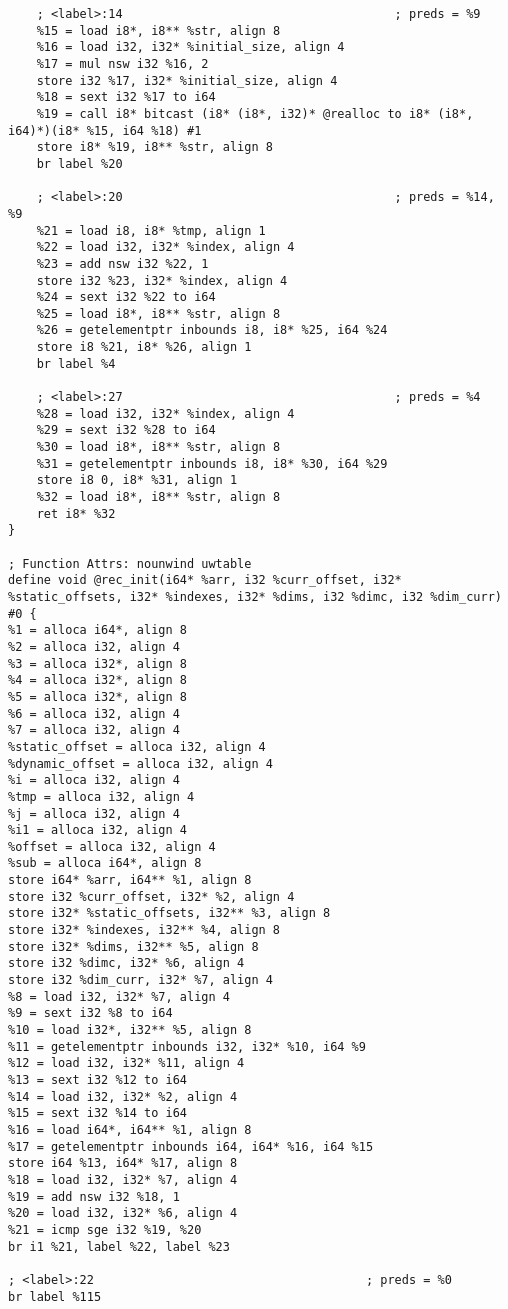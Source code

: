 \begin{verbatim}
	; <label>:14                                      ; preds = %9
	%15 = load i8*, i8** %str, align 8
	%16 = load i32, i32* %initial_size, align 4
	%17 = mul nsw i32 %16, 2
	store i32 %17, i32* %initial_size, align 4
	%18 = sext i32 %17 to i64
	%19 = call i8* bitcast (i8* (i8*, i32)* @realloc to i8* (i8*, i64)*)(i8* %15, i64 %18) #1
	store i8* %19, i8** %str, align 8
	br label %20
	
	; <label>:20                                      ; preds = %14, %9
	%21 = load i8, i8* %tmp, align 1
	%22 = load i32, i32* %index, align 4
	%23 = add nsw i32 %22, 1
	store i32 %23, i32* %index, align 4
	%24 = sext i32 %22 to i64
	%25 = load i8*, i8** %str, align 8
	%26 = getelementptr inbounds i8, i8* %25, i64 %24
	store i8 %21, i8* %26, align 1
	br label %4
	
	; <label>:27                                      ; preds = %4
	%28 = load i32, i32* %index, align 4
	%29 = sext i32 %28 to i64
	%30 = load i8*, i8** %str, align 8
	%31 = getelementptr inbounds i8, i8* %30, i64 %29
	store i8 0, i8* %31, align 1
	%32 = load i8*, i8** %str, align 8
	ret i8* %32
}

; Function Attrs: nounwind uwtable
define void @rec_init(i64* %arr, i32 %curr_offset, i32* %static_offsets, i32* %indexes, i32* %dims, i32 %dimc, i32 %dim_curr) #0 {
%1 = alloca i64*, align 8
%2 = alloca i32, align 4
%3 = alloca i32*, align 8
%4 = alloca i32*, align 8
%5 = alloca i32*, align 8
%6 = alloca i32, align 4
%7 = alloca i32, align 4
%static_offset = alloca i32, align 4
%dynamic_offset = alloca i32, align 4
%i = alloca i32, align 4
%tmp = alloca i32, align 4
%j = alloca i32, align 4
%i1 = alloca i32, align 4
%offset = alloca i32, align 4
%sub = alloca i64*, align 8
store i64* %arr, i64** %1, align 8
store i32 %curr_offset, i32* %2, align 4
store i32* %static_offsets, i32** %3, align 8
store i32* %indexes, i32** %4, align 8
store i32* %dims, i32** %5, align 8
store i32 %dimc, i32* %6, align 4
store i32 %dim_curr, i32* %7, align 4
%8 = load i32, i32* %7, align 4
%9 = sext i32 %8 to i64
%10 = load i32*, i32** %5, align 8
%11 = getelementptr inbounds i32, i32* %10, i64 %9
%12 = load i32, i32* %11, align 4
%13 = sext i32 %12 to i64
%14 = load i32, i32* %2, align 4
%15 = sext i32 %14 to i64
%16 = load i64*, i64** %1, align 8
%17 = getelementptr inbounds i64, i64* %16, i64 %15
store i64 %13, i64* %17, align 8
%18 = load i32, i32* %7, align 4
%19 = add nsw i32 %18, 1
%20 = load i32, i32* %6, align 4
%21 = icmp sge i32 %19, %20
br i1 %21, label %22, label %23

; <label>:22                                      ; preds = %0
br label %115


\end{verbatim}
